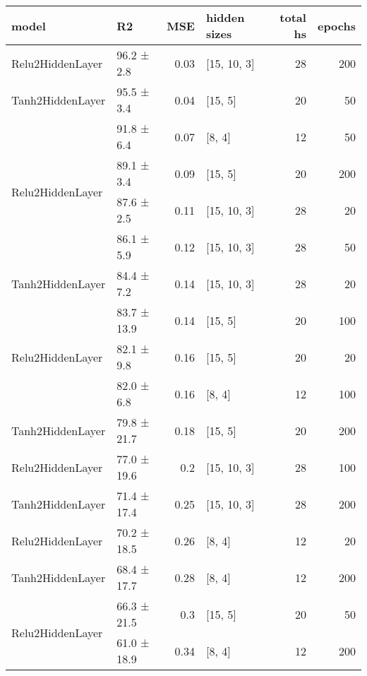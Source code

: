 
    \begin{table*}
        \centering
        \begin{tabular}{llrlrr}
\hline
 model                             & R2          &   MSE & hidden sizes   &   total hs &   epochs \\
\hline
 Relu2HiddenLayer                  & 96.2 ± 2.8  &  0.03 & [15, 10, 3]    &         28 &      200 \\
 Tanh2HiddenLayer                  & 95.5 ± 3.4  &  0.04 & [15, 5]        &         20 &       50 \\
 \multirow{4}{*}{Relu2HiddenLayer} & 91.8 ± 6.4  &  0.07 & [8, 4]         &         12 &       50 \\
                                   & 89.1 ± 3.4  &  0.09 & [15, 5]        &         20 &      200 \\
                                   & 87.6 ± 2.5  &  0.11 & [15, 10, 3]    &         28 &       20 \\
                                   & 86.1 ± 5.9  &  0.12 & [15, 10, 3]    &         28 &       50 \\
 Tanh2HiddenLayer                  & 84.4 ± 7.2  &  0.14 & [15, 10, 3]    &         28 &       20 \\
 \multirow{3}{*}{Relu2HiddenLayer} & 83.7 ± 13.9 &  0.14 & [15, 5]        &         20 &      100 \\
                                   & 82.1 ± 9.8  &  0.16 & [15, 5]        &         20 &       20 \\
                                   & 82.0 ± 6.8  &  0.16 & [8, 4]         &         12 &      100 \\
 Tanh2HiddenLayer                  & 79.8 ± 21.7 &  0.18 & [15, 5]        &         20 &      200 \\
 Relu2HiddenLayer                  & 77.0 ± 19.6 &  0.2  & [15, 10, 3]    &         28 &      100 \\
 Tanh2HiddenLayer                  & 71.4 ± 17.4 &  0.25 & [15, 10, 3]    &         28 &      200 \\
 Relu2HiddenLayer                  & 70.2 ± 18.5 &  0.26 & [8, 4]         &         12 &       20 \\
 Tanh2HiddenLayer                  & 68.4 ± 17.7 &  0.28 & [8, 4]         &         12 &      200 \\
 \multirow{2}{*}{Relu2HiddenLayer} & 66.3 ± 21.5 &  0.3  & [15, 5]        &         20 &       50 \\
                                   & 61.0 ± 18.9 &  0.34 & [8, 4]         &         12 &      200 \\

\end{tabular}
\end{table*}
